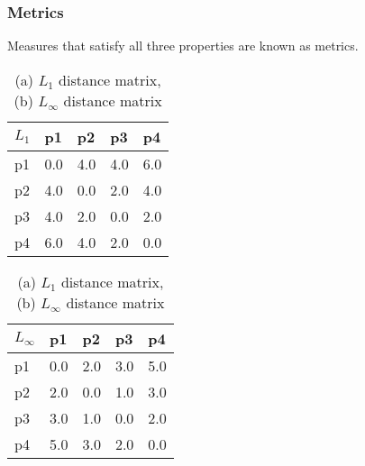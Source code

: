 \begin{frame}[fragile]\frametitle{Metrics}

	Measures that satisfy all three properties are known as metrics.

\begin{table}[!h]
		\centering
		\begin{tabular}{| l | l | l | l | l |}
			\hline
			$L_{1}$ & p1 & p2 & p3 & p4 \\ \hline
			p1 & 0.0 & 4.0 & 4.0 & 6.0 \\ \hline
			p2 & 4.0 & 0.0 & 2.0 & 4.0 \\ \hline
			p3 & 4.0 & 2.0 & 0.0 & 2.0 \\ \hline
			p4 & 6.0 & 4.0 & 2.0 & 0.0 \\ \hline
		\end{tabular}
		\begin{tabular}{| l | l | l | l | l |}
			\hline
			$L_\infty$ & p1 & p2 & p3 & p4 \\ \hline 
			p1 & 0.0 & 2.0 & 3.0 & 5.0 \\ \hline
			p2 & 2.0 & 0.0 & 1.0 & 3.0 \\ \hline
			p3 & 3.0 & 1.0 & 0.0 & 2.0 \\ \hline
			p4 & 5.0 & 3.0 & 2.0 & 0.0 \\ \hline
		\end{tabular}
		\caption{(a) $L_{1}$ distance matrix, (b) $L_{\infty}$ distance matrix}
\end{table}
\end{frame}



